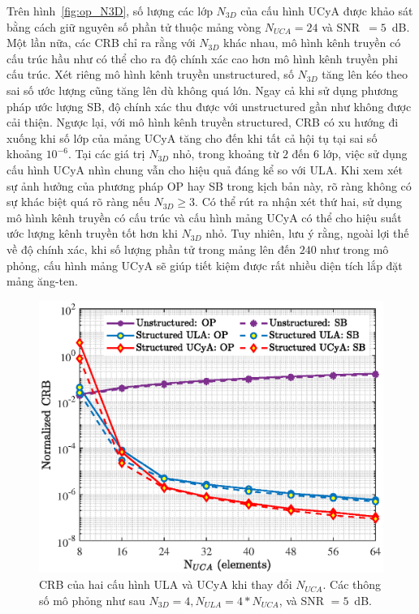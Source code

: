 Trên hình~\ref{fig:op_N3D}, số lượng các lớp $N_{3D}$ của cấu hình UCyA được khảo sát bằng cách giữ nguyên số phần tử thuộc mảng vòng $N_{UCA} = 24$ và SNR~$=5$~dB. Một lần nữa, các CRB chỉ ra rằng với $N_{3D}$ khác nhau, mô hình kênh truyền có cấu trúc hầu như có thể cho ra độ chính xác cao hơn mô hình kênh truyền phi cấu trúc. Xét riêng mô hình kênh truyền unstructured, số $N_{3D}$ tăng lên kéo theo sai số ước lượng cũng tăng lên dù không quá lớn. Ngay cả khi sử dụng phương pháp ước lượng SB, độ chính xác thu được với unstructured gần như không được cải thiện. Ngược lại, với mô hình kênh truyền structured, CRB có xu hướng đi xuống khi số lớp của mảng UCyA tăng cho đến khi tất cả hội tụ tại sai số khoảng $10^{-6}$. Tại các giá trị $N_{3D}$ nhỏ, trong khoảng từ $2$ đến $6$ lớp, việc sử dụng cấu hình UCyA nhìn chung vẫn cho hiệu quả đáng kể so với ULA. Khi xem xét sự ảnh hưởng của phương pháp OP hay SB trong kịch bản này, rõ ràng không có sự khác biệt quá rõ ràng nếu $N_{3D} \ge 3$. Có thể rút ra nhận xét thứ hai, sử dụng mô hình kênh truyền có cấu trúc và cấu hình mảng UCyA có thể cho hiệu suất ước lượng kênh truyền tốt hơn khi $N_{3D}$ nhỏ. Tuy nhiên, lưu ý rằng, ngoài lợi thế về độ chính xác, khi số lượng phần tử trong mảng lên đến $240$ như trong mô phỏng, cấu hình mảng UCyA sẽ giúp tiết kiệm được rất nhiều diện tích lắp đặt mảng ăng-ten.
\begin{figure}[ht]
    \centering
    \includegraphics[width=\linewidth]{figures/fig_3_3.eps}
    \caption{CRB của hai cấu hình ULA và UCyA khi thay đổi $N_{UCA}$. Các thông số mô phỏng như sau $N_{3D} = 4, N_{ULA} = 4 * N_{UCA}$, và SNR $=5$~dB.}
    \label{fig:op_NUCA}
\end{figure}

